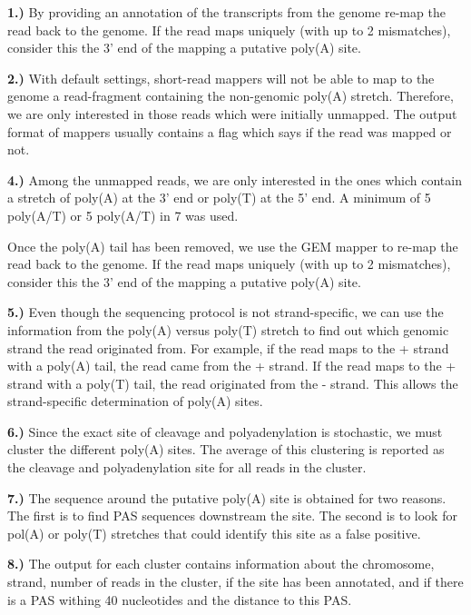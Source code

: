 \textbf{1.)} By providing an annotation of the transcripts from the genome
re-map the read back to the genome. If the read maps uniquely (with up to 2
mismatches), consider this the 3' end of the mapping a putative poly(A) site.

\textbf{2.)} With default settings, short-read mappers will not be able to map
to the genome a read-fragment containing the non-genomic poly(A)
stretch. Therefore, we are only interested in those reads which were initially
unmapped. The output format of mappers usually contains a flag which says if
the read was mapped or not.

\textbf{4.)} Among the unmapped reads, we are only interested in the ones which
contain a stretch of poly(A) at the 3' end or poly(T) at the 5' end. A minimum
of 5 poly(A/T) or 5 poly(A/T) in 7 was used.

Once the poly(A) tail has been removed, we use the GEM mapper to re-map the
read back to the genome. If the read maps uniquely (with up to 2 mismatches),
consider this the 3' end of the mapping a putative poly(A) site.

\textbf{5.)} Even though the sequencing protocol is not strand-specific, we can
use the information from the poly(A) versus poly(T) stretch to find out which
genomic strand the read originated from. For example, if the read maps to the
+ strand with a poly(A) tail, the read came from the + strand. If the
read maps to the + strand with a poly(T) tail, the read originated from the -
strand. This allows the strand-specific determination of poly(A) sites.

\textbf{6.)} Since the exact site of cleavage and polyadenylation is stochastic,
we must cluster the different poly(A) sites. The average of this clustering is
reported as the cleavage and polyadenylation site for all reads in the cluster.

\textbf{7.)} The sequence around the putative poly(A) site is obtained for two
reasons. The first is to find PAS sequences downstream the site. The second is
to look for pol(A) or poly(T) stretches that could identify this site as a
false positive.

\textbf{8.)} The output for each cluster contains information about the
chromosome, strand, number of reads in the cluster, if the site has been
annotated, and if there is a PAS withing 40 nucleotides and the distance to
this PAS.

